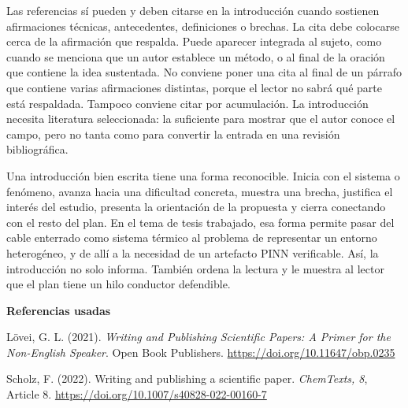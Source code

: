 \documentclass[11pt]{article}
\begin{document}
Las referencias sí pueden y deben citarse en la introducción cuando sostienen afirmaciones técnicas, antecedentes, definiciones o brechas. La cita debe colocarse cerca de la afirmación que respalda. Puede aparecer integrada al sujeto, como cuando se menciona que un autor establece un método, o al final de la oración que contiene la idea sustentada. No conviene poner una cita al final de un párrafo que contiene varias afirmaciones distintas, porque el lector no sabrá qué parte está respaldada. Tampoco conviene citar por acumulación. La introducción necesita literatura seleccionada: la suficiente para mostrar que el autor conoce el campo, pero no tanta como para convertir la entrada en una revisión bibliográfica.

Una introducción bien escrita tiene una forma reconocible. Inicia con el sistema o fenómeno, avanza hacia una dificultad concreta, muestra una brecha, justifica el interés del estudio, presenta la orientación de la propuesta y cierra conectando con el resto del plan. En el tema de tesis trabajado, esa forma permite pasar del cable enterrado como sistema térmico al problema de representar un entorno heterogéneo, y de allí a la necesidad de un artefacto PINN verificable. Así, la introducción no solo informa. También ordena la lectura y le muestra al lector que el plan tiene un hilo conductor defendible.

\vspace{0.5em}
\textbf{Referencias usadas}

Lövei, G. L. (2021). \textit{Writing and Publishing Scientific Papers: A Primer for the Non-English Speaker}. Open Book Publishers. \url{https://doi.org/10.11647/obp.0235}

Scholz, F. (2022). Writing and publishing a scientific paper. \textit{ChemTexts, 8}, Article 8. \url{https://doi.org/10.1007/s40828-022-00160-7}
\end{document}
